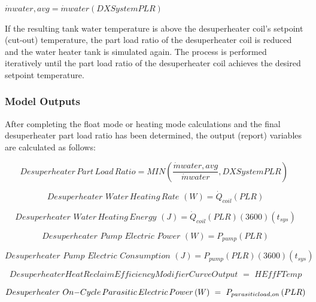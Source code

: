 \textbf{\(\dot mwater,avg = \dot mwater\left( {DXSystemPLR} \right)\)}

If the resulting tank water temperature is above the desuperheater coil's setpoint (cut-out) temperature, the part load ratio of the desuperheater coil is reduced and the water heater tank is simulated again. The process is performed iteratively until the part load ratio of the desuperheater coil achieves the desired setpoint temperature.

\subsubsection{Model Outputs}\label{model-outputs}

After completing the float mode or heating mode calculations and the final desuperheater part load ratio has been determined, the output (report) variables are calculated as follows:

\begin{equation}
Desuperheater\,Part\,Load\,Ratio = MIN\left( {\frac{{\dot mwater,avg}}{{\dot mwater}},DXSystemPLR} \right)\,\,
\end{equation}

\begin{equation}
Desuperheater\,\,Water\,Heating\,Rate\,\,(W) = {\dot Q_{coil}}\left( {PLR} \right)
\end{equation}

\begin{equation}
Desuperheater\,\,Water\,Heating\,Energy\,\,(J) = {\dot Q_{coil}}\left( {PLR} \right)(3600)\left( {{t_{sys}}} \right)
\end{equation}

\begin{equation}
Desuperheater\,\,Pump\,\,Electric\,\,Power\,\,(W) = {P_{pump}}\left( {PLR} \right)
\end{equation}

\begin{equation}
Desuperheater\,\,Pump\,\,Electric\,\,Consumption\,\,(J) = {P_{pump}}\left( {PLR} \right)\left( {3600} \right)\left( {{t_{sys}}} \right)
\end{equation}

\begin{equation}
Desuperheater Heat Reclaim Efficiency Modifier Curve Output\,\, = \,\,HEffFTemp
\end{equation}

\begin{equation}
Desuperheater\,\,On{\rm{ - }}Cycle\,Parasitic\,Electric\,Power\,(W)\,\, = \,\,{P_{parasiticload,on}}\left( {PLR} \right)
\end{equation}

